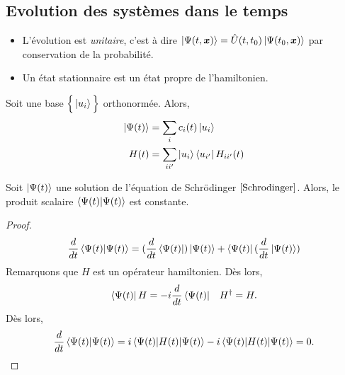 \documentclass[../notesdecours.tex]{subfiles}
\begin{document}
\subsection{Evolution des systèmes dans le temps}
\begin{center}
\end{center}
\begin{itemize}
\item L'évolution est \textit{unitaire}, c'est à dire $\ket{\Psi (t,\bm{x})} = \hat{U} (t,t_0)\ket{\Psi (t_0,\bm{x})}$ par conservation de la probabilité.
\item Un état stationnaire est un état propre de l'hamiltonien.
\end{itemize}
Soit une base $\Big\{\ket{u_i}\Big\}$ orthonormée. Alors,
\begin{align}
\ket{\Psi(t)} &= \sum_i c_i(t)\ket{u_i}\\
H(t) &= \sum_{i i'} \ket{u_i}\bra{u_{i'}} H_{ii'} (t)
\end{align}

\begin{Property} Soit $\ket{\Psi(t)}$ une solution de l'équation de Schrödinger $\eqref{Schrodinger}$. Alors, le produit scalaire $\braket{\Psi(t)|\Psi(t)}$ est constante. \end{Property}
\begin{proof}
\begin{equation}
\frac{d}{dt} \braket{\Psi(t)|\Psi(t)} = (\frac{d}{dt}\bra{\Psi(t)})\ket{\Psi(t)} + \bra{\Psi(t)}(\frac{d}{dt}\ket{\Psi(t)})
\end{equation}
Remarquons que $H$ est un opérateur hamiltonien. Dès lors,
\begin{align}
\bra{\Psi(t)}H &= -i\frac{d}{dt}\bra{\Psi(t)}		&H^\dag = H.
\end{align}
Dès lors,
\begin{align}
\frac{d}{dt} \braket{\Psi(t)|\Psi(t)} = i \braket{\Psi(t) | H(t) | \Psi(t)} - i \braket{\Psi(t)|H(t)|\Psi(t)} = 0.
\end{align}
\end{proof}
\end{document}

